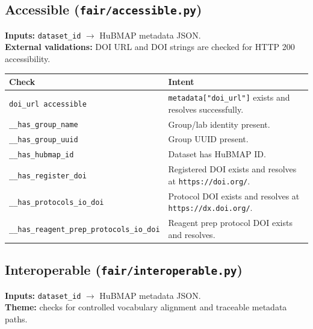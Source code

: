\documentclass[11pt]{article}
\begin{document}
\subsection{Accessible (\texttt{fair/accessible.py})}
\textbf{Inputs:} \texttt{dataset\_id} \(\rightarrow\) HuBMAP metadata JSON.\\
\textbf{External validations:} DOI URL and DOI strings are checked for HTTP 200 accessibility.

\begin{center}
\begin{tabular}{@{}p{}p{}@{}}
\toprule
\textbf{Check} & \textbf{Intent} \\
\midrule
\texttt{doi\_url accessible} & \texttt{metadata["doi\_url"]} exists and resolves successfully. \\
\texttt{\_\_has\_group\_name} & Group/lab identity present. \\
\texttt{\_\_has\_group\_uuid} & Group UUID present. \\
\texttt{\_\_has\_hubmap\_id} & Dataset has HuBMAP ID. \\
\texttt{\_\_has\_register\_doi} & Registered DOI exists and resolves at \texttt{https://doi.org/}. \\
\texttt{\_\_has\_protocols\_io\_doi} & Protocol DOI exists and resolves at \texttt{https://dx.doi.org/}. \\
\texttt{\_\_has\_reagent\_prep\_protocols\_io\_doi} & Reagent prep protocol DOI exists and resolves. \\
\bottomrule
\end{tabular}
\end{center}

\subsection{Interoperable (\texttt{fair/interoperable.py})}
\textbf{Inputs:} \texttt{dataset\_id} \(\rightarrow\) HuBMAP metadata JSON.\\
\textbf{Theme:} checks for controlled vocabulary alignment and traceable metadata paths.
\end{document}
